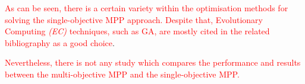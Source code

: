 \textcolor{red}{As can be seen, there is a certain variety within the optimisation methods for solving the single-objective MPP approach. Despite that, Evolutionary Computing \textit{(EC)} techniques, such as GA, are mostly cited in the related bibliography as a good choice\cite{Ngo2016, Seljak2009, Moreira2018}}. 

\textcolor{red}{Nevertheless, there is not any study which compares the performance and results between the multi-objective MPP and the single-objective MPP.}